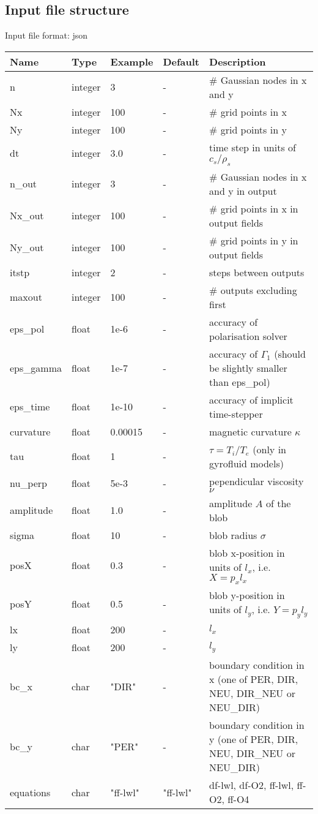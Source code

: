 \subsection{Input file structure}
Input file format: json

\begin{longtable}{llll>{\RaggedRight}p{7cm}}
\toprule
\rowcolor{gray!50}\textbf{Name} &  \textbf{Type} & \textbf{Example} & \textbf{Default} & \textbf{Description}  \\ \midrule
n      & integer & 3 & - &\# Gaussian nodes in x and y \\
Nx     & integer &100& - &\# grid points in x \\
Ny     & integer &100& - &\# grid points in y \\
dt     & integer &3.0& - &time step in units of $c_s/\rho_s$ \\
n\_out  & integer &3  & - &\# Gaussian nodes in x and y in output \\
Nx\_out & integer &100& - &\# grid points in x in output fields \\
Ny\_out & integer &100& - &\# grid points in y in output fields \\
itstp  & integer &2  & - &   steps between outputs \\
maxout & integer &100& - &      \# outputs excluding first \\
eps\_pol   & float &1e-6    & - &  accuracy of polarisation solver \\
eps\_gamma & float &1e-7    & - & accuracy of $\Gamma_1$ (should be slightly smaller than eps\_pol) \\
eps\_time  & float &1e-10   & - & accuracy of implicit time-stepper \\
curvature  & float &0.00015& - & magnetic curvature $\kappa$ \\
tau        & float &1      & - & $\tau = T_i/T_e$ (only in gyrofluid models) \\
nu\_perp    & float &5e-3   & - & pependicular viscosity $\nu$ \\
amplitude  & float &1.0    & - & amplitude $A$ of the blob \\
sigma      & float &10     & - & blob radius $\sigma$ \\
posX       & float &0.3    & - & blob x-position in units of $l_x$, i.e. $X = p_x l_x$\\
posY       & float &0.5    & - & blob y-position in units of $l_y$, i.e. $Y = p_y l_y$ \\
lx         & float &200    & - & $l_x$  \\
ly         & float &200    & - & $l_y$  \\
bc\_x   & char & "DIR"      & - & boundary condition in x (one of PER, DIR, NEU, DIR\_NEU or NEU\_DIR) \\
bc\_y   & char & "PER"      & - & boundary condition in y (one of PER, DIR, NEU, DIR\_NEU or NEU\_DIR) \\
equations  & char & "ff-lwl" & "ff-lwl" &df-lwl, df-O2, ff-lwl, ff-O2, ff-O4\\
\bottomrule
\end{longtable}

